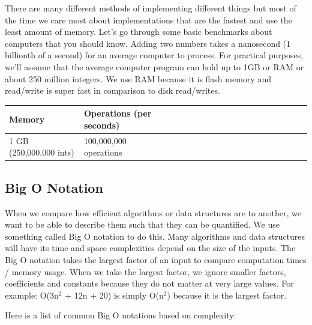 \documentclass[11pt,oneside]{book}
\begin{document}
There are many different methods of implementing different things but most of the time we care most about implementations that are the fastest and use the least amount of memory. Let's go through some basic benchmarks about computers that you should know. Adding two numbers takes a nanosecond (1 billionth of a second) for an average computer to process. For practical purposes, we'll assume that the average computer program can hold up to 1GB or RAM or about 250 million integers. We use RAM because it is flash memory and read/write is super fast in comparison to disk read/writes.

\vspace{10pt} \begin{tabular}{|l|l|l|l|l|l|l|l|l|l|l|l|l|l|l|l|l|l|l}\hline


  Memory &
  Operations (per seconds)\\
\hline


  1 GB (250,000,000 ints) &
  100,000,000 operations\\

\hline\end{tabular}

\subsection{Big O Notation}

When we compare how efficient algorithms or data structures are to another, we want to be able to describe them such that they can be quantified. We use something called Big O notation to do this. Many algorithms and data structures will have its time and space complexities depend on the size of the inputs. The Big O notation takes the largest factor of an input to compare computation times / memory usage. When we take the largest factor, we ignore smaller factors, coefficients and constants because they do not matter at very large values. For example: O(3n$^{2}$ + 12n + 20) is simply O(n$^{2}$) because it is the largest factor.

Here is a list of common Big O notations based on complexity:
\end{document}

